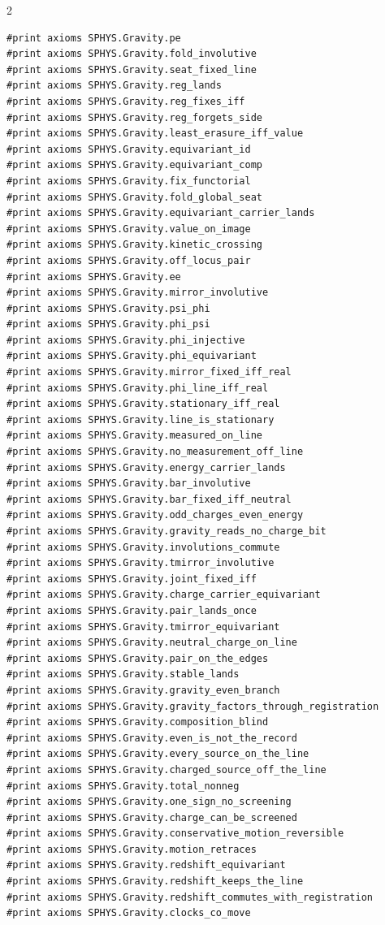 \documentclass[10pt]{article}
\begin{document}
\begin{multicols}{2}
\begin{Verbatim}[fontsize=\fontsize{5.9}{6.8}\selectfont,breaklines,breakanywhere,breaksymbolleft={}]
#print axioms SPHYS.Gravity.pe
#print axioms SPHYS.Gravity.fold_involutive
#print axioms SPHYS.Gravity.seat_fixed_line
#print axioms SPHYS.Gravity.reg_lands
#print axioms SPHYS.Gravity.reg_fixes_iff
#print axioms SPHYS.Gravity.reg_forgets_side
#print axioms SPHYS.Gravity.least_erasure_iff_value
#print axioms SPHYS.Gravity.equivariant_id
#print axioms SPHYS.Gravity.equivariant_comp
#print axioms SPHYS.Gravity.fix_functorial
#print axioms SPHYS.Gravity.fold_global_seat
#print axioms SPHYS.Gravity.equivariant_carrier_lands
#print axioms SPHYS.Gravity.value_on_image
#print axioms SPHYS.Gravity.kinetic_crossing
#print axioms SPHYS.Gravity.off_locus_pair
#print axioms SPHYS.Gravity.ee
#print axioms SPHYS.Gravity.mirror_involutive
#print axioms SPHYS.Gravity.psi_phi
#print axioms SPHYS.Gravity.phi_psi
#print axioms SPHYS.Gravity.phi_injective
#print axioms SPHYS.Gravity.phi_equivariant
#print axioms SPHYS.Gravity.mirror_fixed_iff_real
#print axioms SPHYS.Gravity.phi_line_iff_real
#print axioms SPHYS.Gravity.stationary_iff_real
#print axioms SPHYS.Gravity.line_is_stationary
#print axioms SPHYS.Gravity.measured_on_line
#print axioms SPHYS.Gravity.no_measurement_off_line
#print axioms SPHYS.Gravity.energy_carrier_lands
#print axioms SPHYS.Gravity.bar_involutive
#print axioms SPHYS.Gravity.bar_fixed_iff_neutral
#print axioms SPHYS.Gravity.odd_charges_even_energy
#print axioms SPHYS.Gravity.gravity_reads_no_charge_bit
#print axioms SPHYS.Gravity.involutions_commute
#print axioms SPHYS.Gravity.tmirror_involutive
#print axioms SPHYS.Gravity.joint_fixed_iff
#print axioms SPHYS.Gravity.charge_carrier_equivariant
#print axioms SPHYS.Gravity.pair_lands_once
#print axioms SPHYS.Gravity.tmirror_equivariant
#print axioms SPHYS.Gravity.neutral_charge_on_line
#print axioms SPHYS.Gravity.pair_on_the_edges
#print axioms SPHYS.Gravity.stable_lands
#print axioms SPHYS.Gravity.gravity_even_branch
#print axioms SPHYS.Gravity.gravity_factors_through_registration
#print axioms SPHYS.Gravity.composition_blind
#print axioms SPHYS.Gravity.even_is_not_the_record
#print axioms SPHYS.Gravity.every_source_on_the_line
#print axioms SPHYS.Gravity.charged_source_off_the_line
#print axioms SPHYS.Gravity.total_nonneg
#print axioms SPHYS.Gravity.one_sign_no_screening
#print axioms SPHYS.Gravity.charge_can_be_screened
#print axioms SPHYS.Gravity.conservative_motion_reversible
#print axioms SPHYS.Gravity.motion_retraces
#print axioms SPHYS.Gravity.redshift_equivariant
#print axioms SPHYS.Gravity.redshift_keeps_the_line
#print axioms SPHYS.Gravity.redshift_commutes_with_registration
#print axioms SPHYS.Gravity.clocks_co_move

\end{Verbatim}
\end{multicols}
\end{document}
